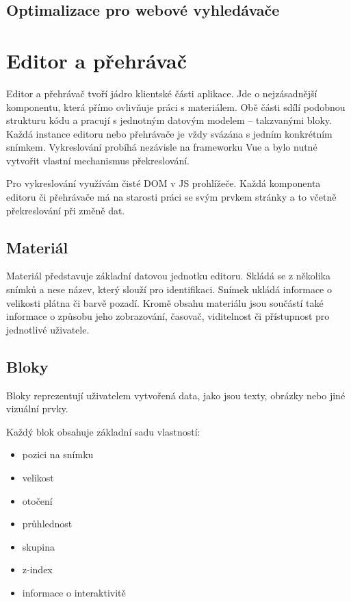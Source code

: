 
\subsection{Optimalizace pro webové vyhledávače}

\section{Editor a přehrávač}\label{text:realizace/editor}

Editor a přehrávač tvoří jádro klientské části aplikace. 
Jde o nejzásadnější komponentu, která přímo ovlivňuje práci s materiálem. 
Obě části sdílí podobnou strukturu kódu a pracují s jednotným datovým modelem -- takzvanými bloky. 
Každá instance editoru nebo přehrávače je vždy svázána s jedním konkrétním snímkem. 
Vykreslování probíhá nezávisle na frameworku Vue a bylo nutné vytvořit vlastní mechanismus překreslování.

Pro vykreslování využívám čisté DOM v JS prohlížeče.
Každá komponenta editoru či přehrávače má na starosti práci se svým prvkem stránky a to včetně překreslování při změně dat.

\subsection{Materiál}

Materiál představuje základní datovou jednotku editoru.
Skládá se z několika snímků a nese název, který slouží pro identifikaci. 
Snímek ukládá informace o velikosti plátna či barvě pozadí.
Kromě obsahu materiálu jsou součástí také informace o způsobu jeho zobrazování, časovač, viditelnost či přístupnost pro jednotlivé uživatele.

\subsection{Bloky}

Bloky reprezentují uživatelem vytvořená data, jako jsou texty, obrázky nebo jiné vizuální prvky. 

Každý blok obsahuje základní sadu vlastností: 

\begin{itemize}
	\item pozici na snímku
	\item velikost
	\item otočení
	\item průhlednost
	\item skupina
	\item z-index
	\item informace o interaktivitě
\end{itemize}

